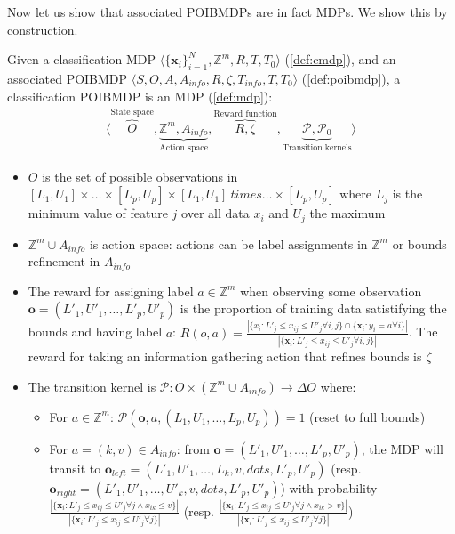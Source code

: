 Now let us show that associated POIBMDPs are in fact MDPs. We show this by construction.

\begin{definition}\label{def:cpoibmdp}
    Given a classification MDP $\langle {\{\boldsymbol{x}_i\}}_{i=1}^N, \mathbb{Z}^m, R, T, T_0 \rangle$ (\ref{def:cmdp}), and an associated POIBMDP $\langle S, O, A, A_{info}, R, \zeta, T_{info}, T, T_0\rangle$ (\ref{def:poibmdp}), a classification POIBMDP is an MDP (\ref{def:mdp}):
    \begin{align*}
        \langle \overbrace{O}^{\text{State space}}, \underbrace{\mathbb{Z}^m, A_{info}}_{\text{Action space}}, \overbrace{R, \zeta}^{\text{Reward function}}, \underbrace{\mathcal{P}, \mathcal{P}_0}_{\text{Transition kernels}} \rangle
    \end{align*}
    \begin{itemize}
        \item $O$ is the set of possible observations in $[L_1, U_1] \times \dots \times [L_p, U_p] \times [L_1, U_1] \ times \dots \times [L_p, U_p] $ where $L_j$ is the minimum value of feature $j$ over all data $x_i$ and $U_j$ the maximum
        \item $\mathbb{Z}^m \cup A_{info}$ is action space: actions can be label assignments in $\mathbb{Z}^m$ or bounds refinement in $A_{info}$
        \item The reward for assigning label $a\in \mathbb{Z}^m$ when observing some observation $\boldsymbol{o}=(L'_1, U'_1, \dots, L'_p, U'_p)$ is the proportion of training data satistifying the bounds and having label $a$: $R(o, a) = \frac{|\{x_i: L'_j \leq x_{ij} \leq U'_j \forall i,j \} \cap \{\boldsymbol{x}_i: y_i = a \forall i \}|}{|\{\boldsymbol{x}_i: L'_j \leq x_{ij} \leq U'_j \forall i,j \}|}$. 
        The reward for taking an information gathering action that refines bounds is $\zeta$
        \item The transition kernel is $\mathcal{P}:O \times (\mathbb{Z}^m \cup A_{info}) \rightarrow \Delta O$ where:
        \begin{itemize}
            \item For $a \in \mathbb{Z}^m$: $\mathcal{P}(\boldsymbol{o}, a, (L_1, U_1, \dots, L_p, U_p)) = 1$ (reset to full bounds)
            \item For $a = (k, v) \in A_{info}$: from $\boldsymbol{o}=(L'_1, U'_1, \dots, L'_p, U'_p)$, the MDP will transit to $\boldsymbol{o}_{left} = (L'_1, U'_1, \dots, L_k, v, dots, L'_p, U'_p)$ (resp. $\boldsymbol{o}_{right} = (L'_1, U'_1, \dots, U'_k, v, dots, L'_p, U'_p)$) with probability $\frac{|\{\boldsymbol{x}_i: L'_j \leq x_{ij} \leq U'_j \forall j \land x_{ik} \leq v\}|}{|\{\boldsymbol{x}_i: L'_j \leq x_{ij} \leq U'_j \forall j\}|}$ (resp. $\frac{|\{\boldsymbol{x}_i: L'_j \leq x_{ij} \leq U'_j \forall j \land x_{ik} > v\}|}{|\{\boldsymbol{x}_i: L'_j \leq x_{ij} \leq U'_j \forall j\}|}$)
        \end{itemize}
    \end{itemize}
\end{definition}

